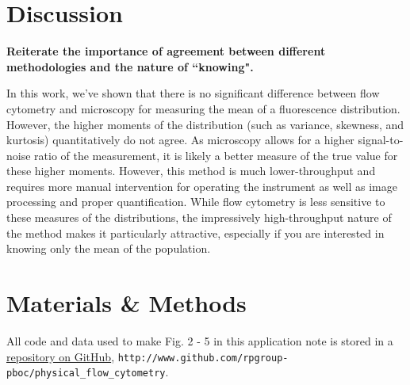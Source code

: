 \documentclass[letterpaper, 10pt]{article}
\begin{document}
\begin{figure}
  \label{fig:central_moments}
\end{figure}

\section*{Discussion}
\textbf{Reiterate the importance of agreement between different methodologies and the
nature of ``knowing". }

In this work, we've shown that there is no significant difference between flow
cytometry and microscopy for measuring the mean of a fluorescence distribution.
However, the  higher moments of the distribution (such as variance, skewness,
and kurtosis) quantitatively do not agree. As microscopy allows for a higher
signal-to-noise ratio of the measurement, it is likely a better measure of the
true value for these higher moments. However, this method is much
lower-throughput and requires more manual intervention for operating the
instrument as well as image processing and proper quantification.
While flow cytometry is less sensitive to these measures of the distributions,
the impressively high-throughput nature of the method makes it particularly
attractive, especially if you are interested in knowing only the mean of the
population.


\section*{Materials \& Methods}
All code and data used to make Fig. 2 - 5 in this application note is stored
in a \href{http://www.github.com/rpgroup-pboc/physical_flow_cytometry}{repository on GitHub},
\texttt{http://www.github.com/rpgroup-pboc/physical\_flow\_cytometry}.
\end{document}
